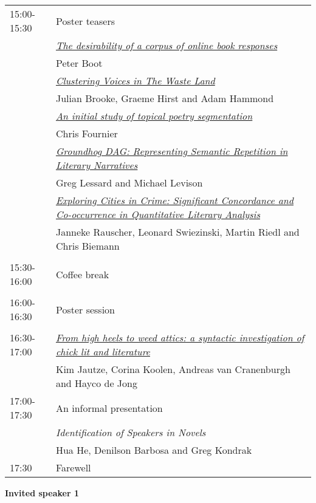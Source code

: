 \begin{tabular}{p{20mm}p{128mm}}
15:00-15:30 & Poster teasers\\
 & \hyperlink{page.42}{\em The desirability of a corpus of online book responses}\\
 & Peter Boot \\

 & \hyperlink{page.51}{\em Clustering Voices in The Waste Land}\\
 & Julian Brooke, Graeme Hirst and Adam Hammond \\

 & \hyperlink{page.66}{\em An initial study of topical poetry segmentation}\\
 & Chris Fournier \\

 & \hyperlink{page.57}{\em Groundhog DAG: Representing Semantic Repetition in Literary Narratives}\\
 & Greg Lessard and Michael Levison \\

 & \hyperlink{page.71}{\em Exploring Cities in Crime: Significant Concordance and Co-occurrence in Quantitative Literary Analysis}\\
 & Janneke Rauscher, Leonard Swiezinski, Martin Riedl and Chris Biemann \\

\\
15:30-16:00 & Coffee break\\
\\

16:00-16:30 & Poster session\\
\\

16:30-17:00 & \hyperlink{page.32}{\em From high heels to weed attics: a syntactic investigation of chick lit and literature}\\
 & Kim Jautze, Corina Koolen, Andreas van Cranenburgh and Hayco de Jong \\

17:00-17:30 & An informal presentation\\
& {\em Identification of Speakers in Novels}\\
 & Hua He, Denilson Barbosa and Greg Kondrak \\

17:30 & Farewell

\end{tabular}

\newpage

\begin{center}
{\large \bf Invited speaker 1}
\end{center}

